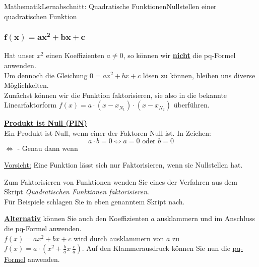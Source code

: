 \documentclass[11pt,twocolumn,oneside,openany,headings=optiontotoc,11pt,numbers=noenddot]{article}
\begin{document}
\begin{worksheet}{Mathematik}{Lernabschnitt: Quadratische Funktionen}{Nullstellen einer quadratischen Funktion}
		\subsubsection*{\(\mathbf{f(x) = ax^2 + bx + c}\)}
		Hat unser \(x^2\) einen Koeffizienten \(a \neq{} 0\), so können wir \underline{\textbf{nicht}} die pq-Formel anwenden.\\
		Um dennoch die Gleichung \(0 = ax^2 +bx + c\) lösen zu können, bleiben uns diverse Möglichkeiten.\\
		Zunächst können wir die Funktion faktorisieren, sie also in die bekannte Linearfaktorform \(f(x) = a\cdot{}(x-x_{N_1})\cdot(x-x_{N_2})\) überführen.
		\begin{framed}
			\noindent
			\underline{\textbf{Produkt ist Null (PIN)}}\\
			Ein Produkt ist Null, wenn einer der Faktoren Null ist. In Zeichen: \[a\cdot{}b = 0 \Leftrightarrow a = 0 \text{\ oder\ } b = 0\]
			\small{\(\Leftrightarrow\) - Genau dann wenn}\normalsize
		\end{framed}
		\begin{framed}
			\noindent
			\underline{Vorsicht:} Eine Funktion lässt sich nur Faktorisieren, wenn sie Nullstellen hat.
		\end{framed}
		\noindent
		Zum Faktorisieren von Funktionen wenden Sie eines der Verfahren aus dem Skript \textit{Quadratischen Funktionen faktorisieren}.\\
		\small{Für Beispiele schlagen Sie in eben genanntem Skript nach.}\normalsize\\
		\par\noindent
		\underline{\textbf{Alternativ}} können Sie auch den Koeffizienten \(a\) ausklammern und im Anschluss die pq-Formel anwenden.\\
		\(f(x) = ax^2 + bx + c\) wird durch ausklammern von \(a\) zu \(f(x) = a\cdot{}(x^2 + \frac{b}{a}x~ \frac{c}{a})\). Auf den Klammerausdruck können Sie nun die \underline{pq-Formel} anwenden.

\end{worksheet}
\end{document}
